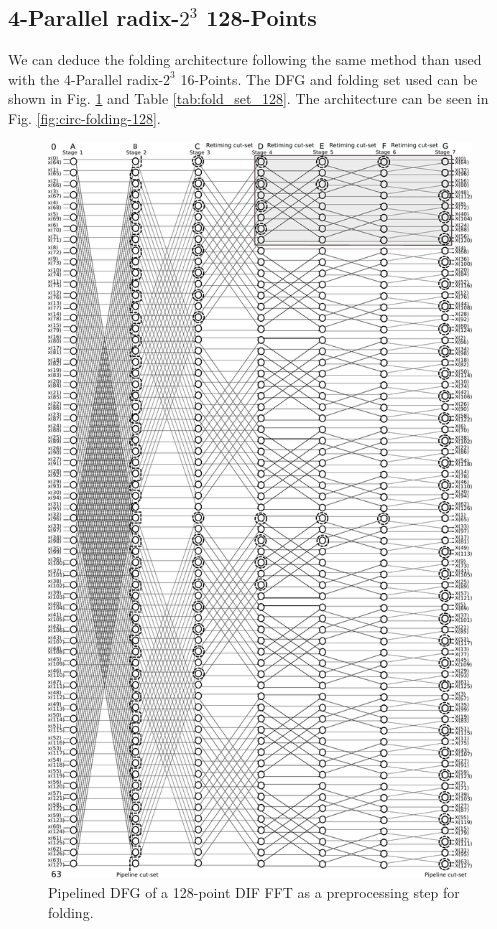 \documentclass[journal,comsoc]{IEEEtran}
\begin{document}
\subsection{4-Parallel radix-$2^3$ 128-Points}
We can deduce the folding architecture following the same method than used with the 4-Parallel radix-$2^3$ 16-Points. The DFG and folding set used can be shown in Fig. \ref{fig:pipe_dfg_128} and Table \ref{tab:fold_set_128}.
The architecture can be seen in Fig. \ref{fig:circ-folding-128}.
\begin{figure}[t!]
\centering
 \includegraphics[width=\linewidth]{Diagramas/miSeccionFiguras/128puntosRadix8BurbujasPipelined_Kevin.pdf}
\caption{Pipelined DFG of a 128-point DIF FFT as a preprocessing step for folding.}
\label{fig:pipe_dfg_128}
\end{figure}
\end{document}
